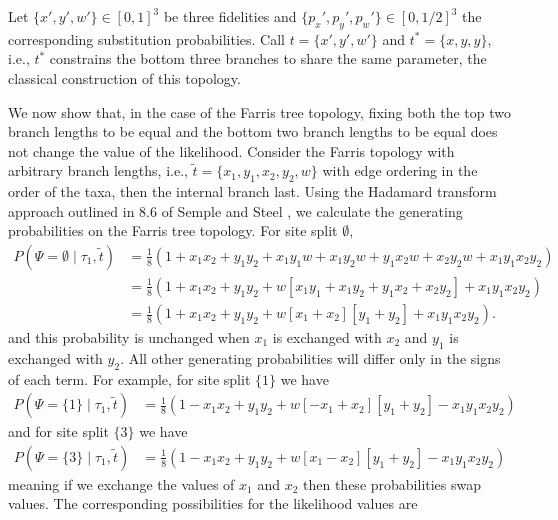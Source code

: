 \documentclass{article}
\newcommand{\siteSplitRV}{\Psi}
\begin{document}
Let $\{x',y',w'\}\in[0,1]^3$ be three fidelities and $\{p_x',p_y',p_w'\}\in[0,1/2]^3$ the corresponding substitution probabilities.
Call $t=\{x',y',w'\}$ and $t^*=\{x,y,y\}$, i.e., $t^*$ constrains the bottom three branches to share the same parameter, the classical construction of this topology.

We now show that, in the case of the Farris tree topology, fixing both the top two branch lengths to be equal and the bottom two branch lengths to be equal does not change the value of the likelihood.
Consider the Farris topology with arbitrary branch lengths, i.e., $\tilde{t}=\{x_1,y_1,x_2,y_2,w\}$ with edge ordering in the order of the taxa, then the internal branch last.
Using the Hadamard transform approach outlined in 8.6 of Semple and Steel \cite{Semple2003-em}, we calculate the generating probabilities on the Farris tree topology.
For site split $\emptyset$,
\begin{align*}
    P(\siteSplitRV=\emptyset\mid \tau_1, \tilde{t}) & = \frac{1}{8} (1 + x_1x_2 +  y_1y_2 +  x_1y_1w + x_1y_2w + y_1x_2w + x_2y_2w + x_1y_1x_2y_2) \\
                                              & = \frac{1}{8} (1 + x_1x_2 +  y_1y_2 +  w[x_1y_1 + x_1y_2 + y_1x_2 + x_2y_2] + x_1y_1x_2y_2) \\
                                              & = \frac{1}{8} (1 + x_1x_2 +  y_1y_2 +  w[x_1 + x_2][y_1 + y_2] + x_1y_1x_2y_2).
\end{align*}
and this probability is unchanged when $x_1$ is exchanged with $x_2$ and $y_1$ is exchanged with $y_2$.
All other generating probabilities will differ only in the signs of each term.
For example, for site split $\{1\}$ we have
\begin{align*}
    P(\siteSplitRV=\{1\}\mid \tau_1, \tilde{t}) & = \frac{1}{8} (1 - x_1x_2 +  y_1y_2 +  w[-x_1 + x_2][y_1 + y_2] - x_1y_1x_2y_2)
\end{align*}
and for site split $\{3\}$ we have
\begin{align*}
    P(\siteSplitRV=\{3\}\mid \tau_1, \tilde{t}) & = \frac{1}{8} (1 - x_1x_2 +  y_1y_2 +  w[x_1 - x_2][y_1 + y_2] - x_1y_1x_2y_2)
\end{align*}
meaning if we exchange the values of $x_1$ and $x_2$ then these probabilities swap values.
The corresponding possibilities for the likelihood values are
\end{document}
